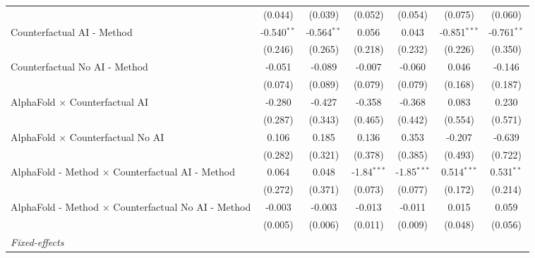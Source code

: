 \begin{tabular}{lcccccc}
                                                              & (0.044)       & (0.039)       & (0.052)       & (0.054)       & (0.075)        & (0.060)\\   
   Counterfactual AI - Method                                 & -0.540$^{**}$ & -0.564$^{**}$ & 0.056         & 0.043         & -0.851$^{***}$ & -0.761$^{**}$\\   
                                                              & (0.246)       & (0.265)       & (0.218)       & (0.232)       & (0.226)        & (0.350)\\   
   Counterfactual No AI - Method                              & -0.051        & -0.089        & -0.007        & -0.060        & 0.046          & -0.146\\   
                                                              & (0.074)       & (0.089)       & (0.079)       & (0.079)       & (0.168)        & (0.187)\\   
   AlphaFold $\times$ Counterfactual AI                       & -0.280        & -0.427        & -0.358        & -0.368        & 0.083          & 0.230\\   
                                                              & (0.287)       & (0.343)       & (0.465)       & (0.442)       & (0.554)        & (0.571)\\   
   AlphaFold $\times$ Counterfactual No AI                    & 0.106         & 0.185         & 0.136         & 0.353         & -0.207         & -0.639\\   
                                                              & (0.282)       & (0.321)       & (0.378)       & (0.385)       & (0.493)        & (0.722)\\   
   AlphaFold - Method $\times$ Counterfactual AI - Method     & 0.064         & 0.048         & -1.84$^{***}$ & -1.85$^{***}$ & 0.514$^{***}$  & 0.531$^{**}$\\   
                                                              & (0.272)       & (0.371)       & (0.073)       & (0.077)       & (0.172)        & (0.214)\\   
   AlphaFold - Method $\times$ Counterfactual No AI - Method  & -0.003        & -0.003        & -0.013        & -0.011        & 0.015          & 0.059\\   
                                                              & (0.005)       & (0.006)       & (0.011)       & (0.009)       & (0.048)        & (0.056)\\   
   \midrule
   \emph{Fixed-effects}\\

\end{tabular}
